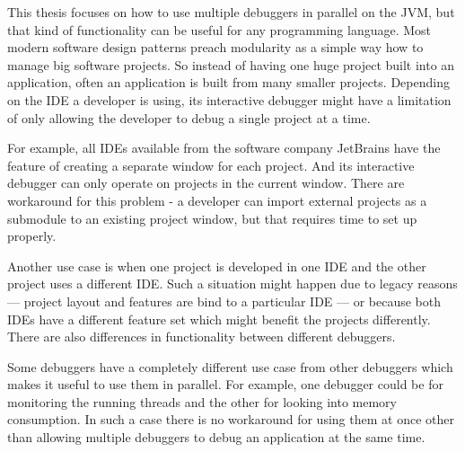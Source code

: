 \documentclass[..thesis.tex]{subfiles}
\begin{document}
This thesis focuses on how to use multiple debuggers in parallel on the JVM, but that kind of functionality can be useful for any programming language. 
Most modern software design patterns preach modularity as a simple way how to manage big software projects.
So instead of having one huge project built into an application, often an application is built from many smaller projects.
Depending on the IDE a developer is using, its interactive debugger might have a limitation of only allowing the developer to debug a single project at a time.

For example, all IDEs available from the software company JetBrains have the feature of creating a separate window for each project.
And its interactive debugger can only operate on projects in the current window.
There are workaround for this problem - a developer can import external projects as a submodule to an existing project window, but that requires time to set up properly.

Another use case is when one project is developed in one IDE and the other project uses a different IDE.
Such a situation might happen due to legacy reasons --- project layout and features are bind to a particular IDE --- or because both IDEs have a different feature set which might benefit the projects differently.
There are also differences in functionality between different debuggers. 

Some debuggers have a completely different use case from other debuggers which makes it useful to use them in parallel.
For example, one debugger could be for monitoring the running threads and the other for looking into memory consumption.
In such a case there is no workaround for using them at once other than allowing multiple debuggers to debug an application at the same time.
\end{document}
